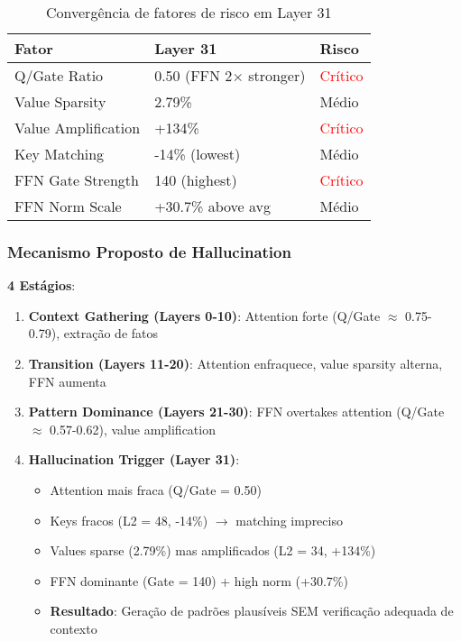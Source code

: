 \documentclass[11pt]{article}
\begin{document}
\begin{table}[H]
\centering
\begin{tabular}{@{}lll@{}}
\toprule
\textbf{Fator} & \textbf{Layer 31} & \textbf{Risco} \\ \midrule
Q/Gate Ratio & 0.50 (FFN 2$\times$ stronger) & \textcolor{red}{Crítico} \\
Value Sparsity & 2.79\% & Médio \\
Value Amplification & +134\% & \textcolor{red}{Crítico} \\
Key Matching & -14\% (lowest) & Médio \\
FFN Gate Strength & 140 (highest) & \textcolor{red}{Crítico} \\
FFN Norm Scale & +30.7\% above avg & Médio \\ \bottomrule
\end{tabular}
\caption{Convergência de fatores de risco em Layer 31}
\end{table}

\subsubsection{Mecanismo Proposto de Hallucination}

\textbf{4 Estágios}:

\begin{enumerate}
    \item \textbf{Context Gathering (Layers 0-10)}: Attention forte (Q/Gate $\approx$ 0.75-0.79), extração de fatos
    \item \textbf{Transition (Layers 11-20)}: Attention enfraquece, value sparsity alterna, FFN aumenta
    \item \textbf{Pattern Dominance (Layers 21-30)}: FFN overtakes attention (Q/Gate $\approx$ 0.57-0.62), value amplification
    \item \textbf{Hallucination Trigger (Layer 31)}:
    \begin{itemize}
        \item Attention mais fraca (Q/Gate = 0.50)
        \item Keys fracos (L2 = 48, -14\%) $\rightarrow$ matching impreciso
        \item Values sparse (2.79\%) mas amplificados (L2 = 34, +134\%)
        \item FFN dominante (Gate = 140) + high norm (+30.7\%)
        \item \textbf{Resultado}: Geração de padrões plausíveis SEM verificação adequada de contexto
    \end{itemize}
\end{enumerate}
\end{document}
